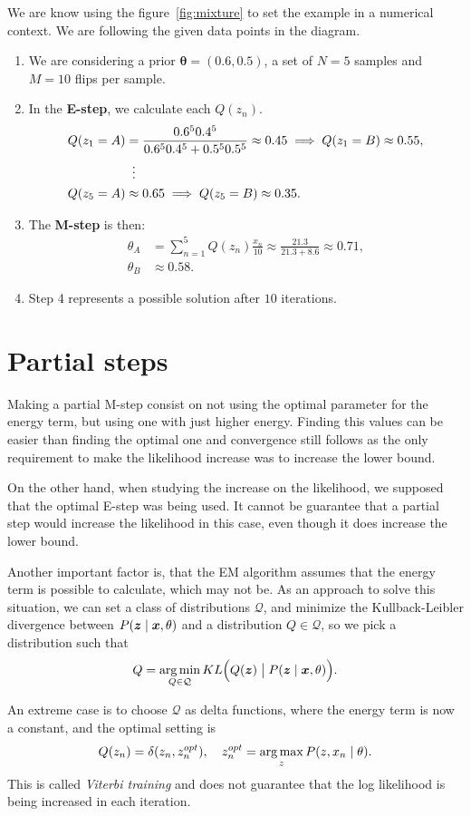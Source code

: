 We are know using the figure~\ref{fig:mixture} to set the example in a numerical context. We are following the given data points in the diagram.
\begin{enumerate}
  \item We are considering a prior \(\bm{\theta} = (0.6, 0.5)\), a set of \(N = 5\) samples and \(M = 10\) flips per sample.
  \item In the \textbf{E-step}, we calculate each \(Q(z_{n})\).
    \[
    \begin{aligned}
      Q(z_{1} = A) &= \frac{0.6^{5} 0.4^{5}}{0.6^{5}0.4^{5} + 0.5^{5}0.5^{5}} \approx 0.45 \implies Q(z_{1} = B) \approx 0.55,\\
      &\mathrel{\makebox[\widthof{=}]{\vdots}} \\
      Q(z_{5} = A) &\approx 0.65 \implies Q(z_{5}=B) \approx 0.35.
    \end{aligned}
    \]
  \item The \textbf{M-step} is then:
    \[
    \begin{aligned}
      \theta_{A} &= \sum_{n=1}^{5}Q(z_{n})\frac{x_{n}}{10} \approx \frac{21.3}{21.3 + 8.6} \approx 0.71,\\
      \theta_{B} &\approx 0.58.
    \end{aligned}
    \]
  \item Step 4 represents a possible solution after \(10\) iterations.
\end{enumerate}


\section{Partial steps}

Making a partial M-step consist on not using the optimal parameter for the energy term, but using one with just higher energy. Finding this values can be easier than finding the optimal one and convergence still follows as the only requirement to make the likelihood increase was to increase the lower bound.

On the other hand, when studying the increase on the likelihood, we supposed that the optimal E-step was being used. It cannot be guarantee that a partial step would increase the likelihood in this case, even though it does increase the lower bound.

Another important factor is, that the EM algorithm assumes that the energy term is possible to calculate, which may not be. As an approach to solve this situation, we can set a class of distributions \(\mathcal{Q}\), and minimize the Kullback-Leibler divergence between \(P(\bm{z} \mid \bm{x}, \theta)\) and a distribution \(Q \in \mathcal{Q}\), so we pick a distribution such that
\[
  Q = \operatorname*{arg\,min}_{Q \in \mathcal{Q}} KL\Big(Q(\bm{z}) \bigm| P(\bm{z}\mid \bm{x}, \theta)\Big).
\]

An extreme case is to choose \(\mathcal{Q}\) as delta functions, where the energy term is now a constant, and the optimal setting is
\[
Q(z_{n}) = \delta (z_{n}, z_{n}^{opt}) , \quad z_{n}^{opt} = \operatorname*{arg\,max}_{z}P(z , x_{n} \mid \theta).
\]
This is called \emph{Viterbi training} and does not guarantee that the log likelihood is being increased in each iteration.
